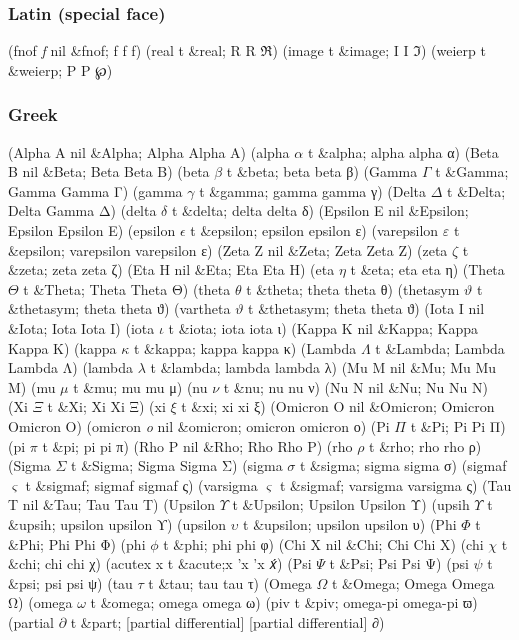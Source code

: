 \documentclass[11pt]{article}
\begin{document}
\subsubsection{Latin (special face)}
\label{sec-1-1-2}
(fnof \textit{f} nil \&fnof; f f ƒ)
(real \Re t \&real; R R ℜ)
(image \Im t \&image; I I ℑ)
(weierp \wp t \&weierp; P P ℘)

\subsubsection{Greek}
\label{sec-1-1-3}
(Alpha A nil \&Alpha; Alpha Alpha Α)
(alpha $\alpha$ t \&alpha; alpha alpha α)
(Beta B nil \&Beta; Beta Beta Β)
(beta $\beta$ t \&beta; beta beta β)
(Gamma $\Gamma$ t \&Gamma; Gamma Gamma Γ)
(gamma $\gamma$ t \&gamma; gamma gamma γ)
(Delta $\Delta$ t \&Delta; Delta Gamma Δ)
(delta $\delta$ t \&delta; delta delta δ)
(Epsilon E nil \&Epsilon; Epsilon Epsilon Ε)
(epsilon $\epsilon$ t \&epsilon; epsilon epsilon ε)
(varepsilon $\varepsilon$ t \&epsilon; varepsilon varepsilon ε)
(Zeta Z nil \&Zeta; Zeta Zeta Ζ)
(zeta $\zeta$ t \&zeta; zeta zeta ζ)
(Eta H nil \&Eta; Eta Eta Η)
(eta $\eta$ t \&eta; eta eta η)
(Theta $\Theta$ t \&Theta; Theta Theta Θ)
(theta $\theta$ t \&theta; theta theta θ)
(thetasym $\vartheta$ t \&thetasym; theta theta ϑ)
(vartheta $\vartheta$ t \&thetasym; theta theta ϑ)
(Iota I nil \&Iota; Iota Iota Ι)
(iota $\iota$ t \&iota; iota iota ι)
(Kappa K nil \&Kappa; Kappa Kappa Κ)
(kappa $\kappa$ t \&kappa; kappa kappa κ)
(Lambda $\Lambda$ t \&Lambda; Lambda Lambda Λ)
(lambda $\lambda$ t \&lambda; lambda lambda λ)
(Mu M nil \&Mu; Mu Mu Μ)
(mu $\mu$ t \&mu; mu mu μ)
(nu $\nu$ t \&nu; nu nu ν)
(Nu N nil \&Nu; Nu Nu Ν)
(Xi $\Xi$ t \&Xi; Xi Xi Ξ)
(xi $\xi$ t \&xi; xi xi ξ)
(Omicron O nil \&Omicron; Omicron Omicron Ο)
(omicron \textit{o} nil \&omicron; omicron omicron ο)
(Pi $\Pi$ t \&Pi; Pi Pi Π)
(pi $\pi$ t \&pi; pi pi π)
(Rho P nil \&Rho; Rho Rho Ρ)
(rho $\rho$ t \&rho; rho rho ρ)
(Sigma $\Sigma$ t \&Sigma; Sigma Sigma Σ)
(sigma $\sigma$ t \&sigma; sigma sigma σ)
(sigmaf $\varsigma$ t \&sigmaf; sigmaf sigmaf ς)
(varsigma $\varsigma$ t \&sigmaf; varsigma varsigma ς)
(Tau T nil \&Tau; Tau Tau Τ)
(Upsilon $\Upsilon$ t \&Upsilon; Upsilon Upsilon Υ)
(upsih $\Upsilon$ t \&upsih; upsilon upsilon ϒ)
(upsilon $\upsilon$ t \&upsilon; upsilon upsilon υ)
(Phi $\Phi$ t \&Phi; Phi Phi Φ)
(phi $\phi$ t \&phi; phi phi φ)
(Chi X nil \&Chi; Chi Chi Χ)
(chi $\chi$ t \&chi; chi chi χ)
(acutex \textasciiacute{} x t \&acute;x 'x 'x 𝑥́)
(Psi $\Psi$ t \&Psi; Psi Psi Ψ)
(psi $\psi$ t \&psi; psi psi ψ)
(tau $\tau$ t \&tau; tau tau τ)
(Omega $\Omega$ t \&Omega; Omega Omega Ω)
(omega $\omega$ t \&omega; omega omega ω)
(piv \varpi t \&piv; omega-pi omega-pi ϖ)
(partial $\partial$ t \&part; [partial differential] [partial differential] ∂)
\end{document}
